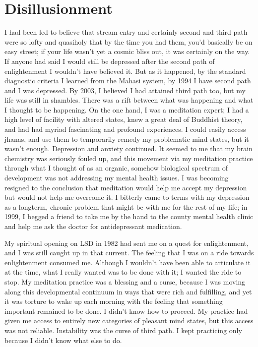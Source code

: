 \documentclass[a5paper,10pt,english]{book}
\begin{document}
\section{Disillusionment}
\label{\detokenize{main-1:disillusionment}}
\sphinxAtStartPar
I had been led to believe that stream entry and certainly second and
third path were so lofty and quasi\sphinxhyphen{}holy that by the time you had them,
you’d basically be on easy street; if your life wasn’t yet a cosmic
bliss out, it was certainly on the way. If anyone had said I would still
be depressed after the second path of enlightenment I wouldn’t have
believed it. But as it happened, by the standard diagnostic criteria I
learned from the Mahasi system, by 1994 I  have second path and I
was  depressed. By 2003, I believed I had attained third path
too, but my life was still in shambles. There was a rift between what
was happening and what I thought  to be happening. On the one
hand, I was a meditation expert; I had a high level of facility with
altered states, knew a great deal of Buddhist theory, and had had myriad
fascinating and profound experiences. I could easily access jhanas, and
use them to temporarily remedy my problematic mind states, but it wasn’t
enough. Depression and anxiety continued. It seemed to me that my brain
chemistry was seriously fouled up, and this movement via my meditation
practice through what I thought of as an organic, somehow biological
spectrum of development was not addressing my mental health issues. I
was becoming resigned to the conclusion that meditation would help me
accept my depression but would not help me overcome it. I bitterly came
to terms with my depression as a long\sphinxhyphen{}term, chronic problem that might
be with me for the rest of my life; in 1999, I begged a friend to take
me by the hand to the county mental health clinic and help me ask the
doctor for antidepressant medication.

\sphinxAtStartPar
My spiritual opening on LSD in 1982 had sent me on a quest for
enlightenment, and I was still caught up in that current. The feeling
that I was on a ride towards enlightenment consumed me. Although I
wouldn’t have been able to articulate it at the time, what I really
wanted was to be done with it; I wanted the ride to stop. My meditation
practice was a blessing and a curse, because I was moving along this
developmental continuum in ways that were rich and fulfilling, and yet
it was torture to wake up each morning with the feeling that something
important remained to be done. I didn’t know how to proceed. My practice
had given me access to entirely new categories of pleasant mind states,
but this access was not reliable. Instability was the curse of third
path. I kept practicing only because I didn’t know what else to do.
\end{document}
